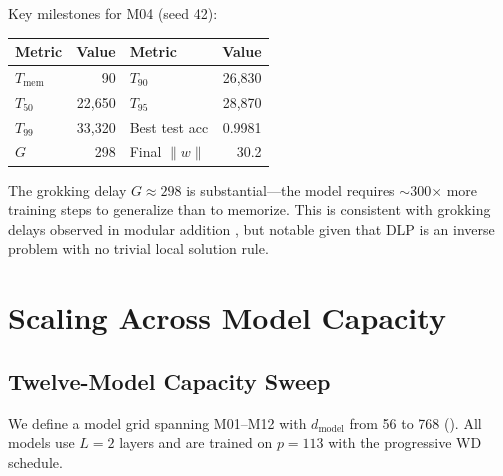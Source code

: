 \documentclass[11pt]{article}
\newcommand{\Tmem}{T_{\mathrm{mem}}}
\newcommand{\Tfifty}{T_{50}}
\newcommand{\Tninety}{T_{90}}
\newcommand{\Tninfive}{T_{95}}
\newcommand{\Tnine}{T_{99}}
\newcommand{\Gdelay}{G}
\newcommand{\dmodel}{d_{\mathrm{model}}}
\begin{document}
Key milestones for M04 (seed 42):
\begin{center}
\begin{tabular}{lrlr}
\toprule
Metric & Value & Metric & Value \\
\midrule
$\Tmem$ & 90 & $\Tninety$ & 26,830 \\
$\Tfifty$ & 22,650 & $\Tninfive$ & 28,870 \\
$\Tnine$ & 33,320 & Best test acc & 0.9981 \\
$\Gdelay$ & 298 & Final $\|w\|$ & 30.2 \\
\bottomrule
\end{tabular}
\end{center}

The grokking delay $\Gdelay \approx 298$ is substantial---the model requires $\sim$300$\times$ more training steps to generalize than to memorize. This is consistent with grokking delays observed in modular addition \citep{power2022grokking}, but notable given that DLP is an inverse problem with no trivial local solution rule.



\section{Scaling Across Model Capacity}
\label{sec:scaling}

\subsection{Twelve-Model Capacity Sweep}

We define a model grid spanning M01--M12 with $\dmodel$ from 56 to 768 (). All models use $L = 2$ layers and are trained on $p = 113$ with the progressive WD schedule.
\end{document}
